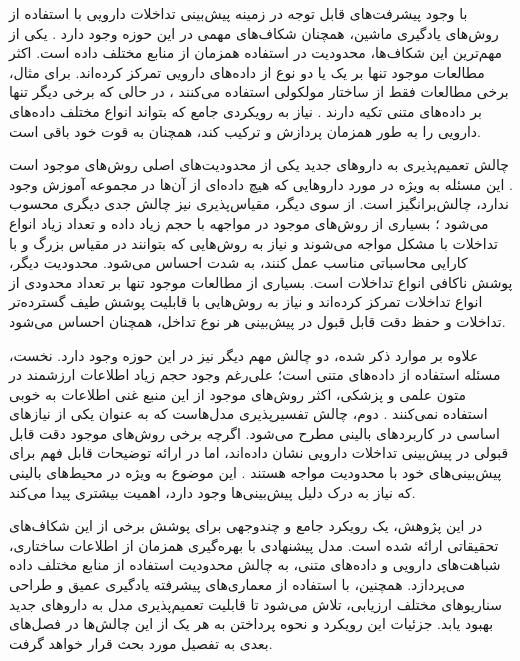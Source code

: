 با وجود پیشرفت‌های قابل توجه در زمینه پیش‌بینی تداخلات دارویی با استفاده از روش‌های یادگیری ماشین، همچنان شکاف‌های مهمی در این حوزه وجود دارد \cite{ref_shi2024}. یکی از مهم‌ترین این شکاف‌ها، محدودیت در استفاده همزمان از منابع مختلف داده است. اکثر مطالعات موجود تنها بر یک یا دو نوع از داده‌های دارویی تمرکز کرده‌اند. برای مثال، برخی مطالعات فقط از ساختار مولکولی استفاده می‌کنند \cite{ref_nyamabo2021}، در حالی که برخی دیگر تنها بر داده‌های متنی تکیه دارند \cite{ref_he2023}. نیاز به رویکردی جامع که بتواند انواع مختلف داده‌های دارویی را به طور همزمان پردازش و ترکیب کند، همچنان به قوت خود باقی است.

چالش تعمیم‌پذیری به داروهای جدید یکی از محدودیت‌های اصلی روش‌های موجود است \cite{ref_deng2020}. این مسئله به ویژه در مورد داروهایی که هیچ داده‌ای از آن‌ها در مجموعه آموزش وجود ندارد، چالش‌برانگیز است. از سوی دیگر، مقیاس‌پذیری نیز چالش جدی دیگری محسوب می‌شود \cite{ref_dai2020}؛ بسیاری از روش‌های موجود در مواجهه با حجم زیاد داده و تعداد زیاد انواع تداخلات با مشکل مواجه می‌شوند و نیاز به روش‌هایی که بتوانند در مقیاس بزرگ و با کارایی محاسباتی مناسب عمل کنند، به شدت احساس می‌شود. محدودیت دیگر، پوشش ناکافی انواع تداخلات است. بسیاری از مطالعات موجود تنها بر تعداد محدودی از انواع تداخلات تمرکز کرده‌اند \cite{ref_ryu2018} و نیاز به روش‌هایی با قابلیت پوشش طیف گسترده‌تر تداخلات و حفظ دقت قابل قبول در پیش‌بینی هر نوع تداخل، همچنان احساس می‌شود.

علاوه بر موارد ذکر شده، دو چالش مهم دیگر نیز در این حوزه وجود دارد. نخست، مسئله استفاده از داده‌های متنی است؛ علی‌رغم وجود حجم زیاد اطلاعات ارزشمند در متون علمی و پزشکی، اکثر روش‌های موجود از این منبع غنی اطلاعات به خوبی استفاده نمی‌کنند \cite{ref_he2023}. دوم، چالش تفسیرپذیری مدل‌هاست که به عنوان یکی از نیازهای اساسی در کاربردهای بالینی مطرح می‌شود. اگرچه برخی روش‌های موجود دقت قابل قبولی در پیش‌بینی تداخلات دارویی نشان داده‌اند، اما در ارائه توضیحات قابل فهم برای پیش‌بینی‌های خود با محدودیت مواجه هستند \cite{ref_lin2022}. این موضوع به ویژه در محیط‌های بالینی که نیاز به درک دلیل پیش‌بینی‌ها وجود دارد، اهمیت بیشتری پیدا می‌کند.

در این پژوهش، یک رویکرد جامع و چندوجهی برای پوشش برخی از این شکاف‌های تحقیقاتی ارائه شده است. مدل پیشنهادی با بهره‌گیری همزمان از اطلاعات ساختاری، شباهت‌های دارویی و داده‌های متنی، به چالش محدودیت استفاده از منابع مختلف داده می‌پردازد. همچنین، با استفاده از معماری‌های پیشرفته یادگیری عمیق و طراحی سناریوهای مختلف ارزیابی، تلاش می‌شود تا قابلیت تعمیم‌پذیری مدل به داروهای جدید بهبود یابد. جزئیات این رویکرد و نحوه پرداختن به هر یک از این چالش‌ها در فصل‌های بعدی به تفصیل مورد بحث قرار خواهد گرفت.
